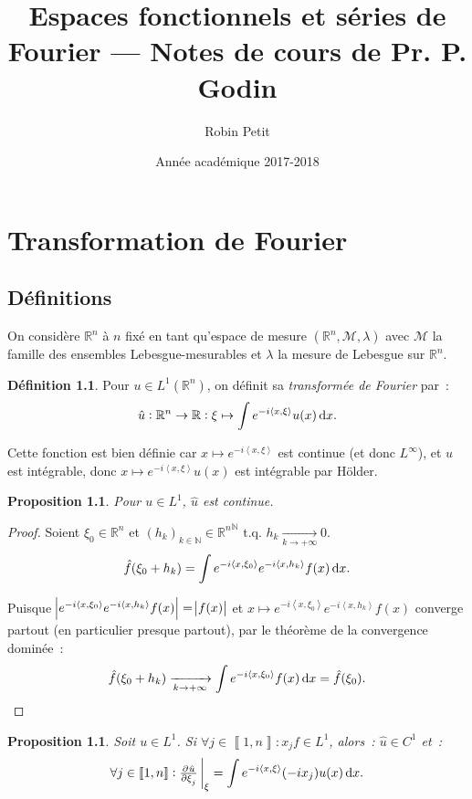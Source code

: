 \documentclass{report}
\title{Espaces fonctionnels et séries de Fourier --- Notes de cours de Pr. P. Godin}
\author{Robin Petit}
\date{Année académique 2017-2018}
\newcommand{\R}{{\mathbb R}}
\newcommand{\N}{{\mathbb N}}
\newcommand{\scpr}[2]{\left\langle#1, #2\right\rangle}
\newcommand{\tq}{\text{ t.q. }}
\newcommand{\pinfty}{{+\infty}}
\newcommand{\intint}[2]{\left\llbracket#1, #2\right\rrbracket}
\newtheorem{prp}[thm]{Proposition}
\theoremstyle{definition}
\newtheorem{déf}[thm]{Définition}
\theoremstyle{remark}
\begin{document}
\maketitle
\tableofcontents
\setcounter{page}{1}

\chapter{Transformation de Fourier}

\section{Définitions}

On considère $\R^n$ à $n$ fixé en tant qu'espace de mesure $(\R^n, \mathcal M, \lambda)$ avec $\mathcal M$ la famille des ensembles Lebesgue-mesurables et $\lambda$
la mesure de Lebesgue sur $\R^n$.

\begin{déf} Pour $u \in L^1(\R^n)$, on définit sa \textit{transformée de Fourier} par~:
\begin{equation}
	\hat u : \R^n \to \R : \xi \mapsto \int e^{-i\scpr x\xi}u(x)\dif x.
\end{equation}
\end{déf}

Cette fonction est bien définie car $x \mapsto e^{-i\scpr x\xi}$ est continue (et donc $L^\infty$), et $u$ est intégrable, donc $x \mapsto e^{-i\scpr x\xi}u(x)$ est intégrable
par Hölder.

\begin{prp} Pour $u \in L^1$, $\hat u$ est continue.
\end{prp}

\begin{proof} Soient $\xi_0 \in \R^n$ et $(h_k)_{k \in \N} \in {\R^n}^\N \tq h_k \xrightarrow[k \to \pinfty]{} 0$.
\[\hat f(\xi_0 + h_k) = \int e^{-i\scpr x{\xi_0}}e^{-i\scpr x{h_k}}f(x)\dif x.\]

Puisque $\abs {e^{-i\scpr x{\xi_0}}e^{-i\scpr x{h_k}}f(x)} = \abs {f(x)}$ et $x \mapsto e^{-i\scpr x{\xi_0}}e^{-i\scpr x{h_k}}f(x)$ converge partout
(en particulier presque partout), par le théorème de la convergence dominée~:
\[\hat f(\xi_0 + h_k) \xrightarrow[k \to \pinfty]{} \int e^{-i\scpr x{\xi_0}}f(x)\dif x = \hat f(\xi_0).\]
\end{proof}

\begin{prp} Soit $u \in L^1$. Si $\forall j \in \intint 1n : x_jf \in L^1$, alors~: $\hat u \in C^1$ et~:
\begin{equation}\label{eq:pd transformée Fourier}
	\forall j \in \intint 1n : \pd {\hat u}{\xi_j}\sVert[3]_\xi = \int e^{-i\scpr x\xi}(-ix_j)u(x)\dif x.
\end{equation}
\end{prp}
\end{document}
